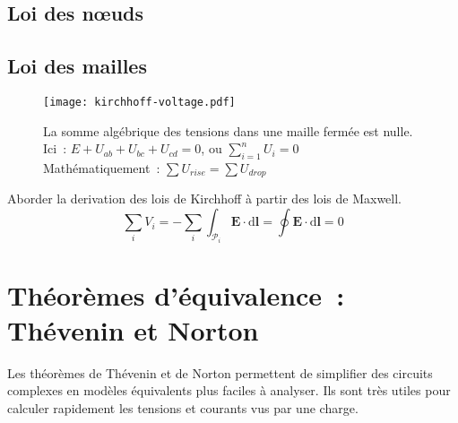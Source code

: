 \subsection{Loi des n{\oe}uds} \label{subsec:noeuds}
\begin{figure}[H]
    \centering
\end{figure}

\subsection{Loi des mailles} \label{subsec:mailles}
\begin{figure}[H]
    \centering
    \texttt{[image: kirchhoff-voltage.pdf]}
    \caption[Loi des mailles.]{
        La somme alg\'ebrique des tensions dans une maille ferm\'ee est nulle.\\
        Ici~: \(E+U_{ab}+U_{bc}+U_{cd}=0\), ou \(\displaystyle\sum_{i=1}^nU_i=0\)\\
        \vspace{\baselineskip}
        Math\'ematiquement~: \(\displaystyle\sum U_{rise} = \displaystyle\sum U_{drop}\)
    }
    \label{fig:kirchhoff-voltage}%
\end{figure}
\begin{Todo}
	Aborder la derivation des lois de Kirchhoff \`a partir des lois de Maxwell.
	\[\sum_i V_i = - \sum_i \int_{\mathcal{P}_i}\mathbf{E}\cdot\mathrm{d}\mathbf{l} = \oint\mathbf{E}\cdot\mathrm{d}\mathbf{l} = 0\]
\end{Todo}

\section{Th\'eor\`emes d'\'equivalence~: Th\'evenin et Norton} \label{subsec:thevenin_norton}
Les th\'eor\`emes de Th\'evenin et de Norton permettent de simplifier des circuits complexes en mod\`eles \'equivalents plus faciles à analyser. Ils sont tr\`es utiles pour calculer rapidement les tensions et courants vus par une charge.

